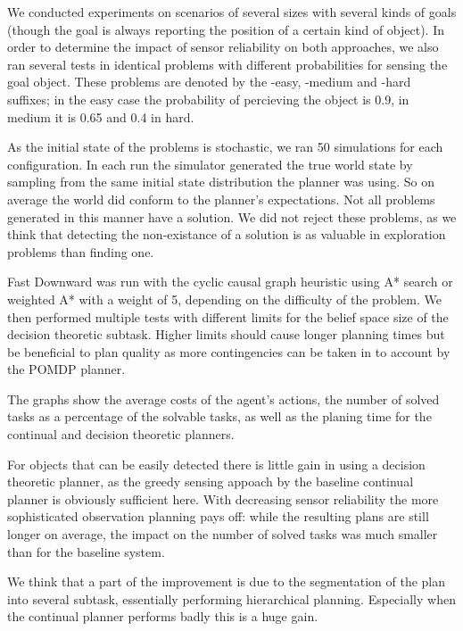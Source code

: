 We conducted experiments on scenarios of several sizes with several
kinds of goals (though the goal is always reporting the position of a
certain kind of object). In order to determine the impact of sensor
reliability on both approaches, we also ran several tests in identical
problems with different probabilities for sensing the goal object.
These problems are denoted by the -easy, -medium and -hard suffixes;
in the easy case the probability of percieving the object is 0.9, in
medium it is 0.65 and 0.4 in hard.

As the initial state of the problems is stochastic, we ran 50
simulations for each configuration. In each run the simulator
generated the true world state by sampling from the same initial state
distribution the planner was using. So on average the world did
conform to the planner's expectations. Not all problems generated in
this manner have a solution. We did not reject these problems, as we
think that detecting the non-existance of a solution is as valuable in
exploration problems than finding one.

Fast Downward was run with the cyclic causal graph heuristic using A*
search or weighted A* with a weight of 5, depending on the difficulty
of the problem. We then performed multiple tests with different limits
for the belief space size of the decision theoretic subtask. Higher
limits should cause longer planning times but be beneficial to plan
quality as more contingencies can be taken in to account by the POMDP
planner.

The graphs show the average costs of the agent's actions, the number
of solved tasks as a percentage of the solvable tasks, as well as the
planing time for the continual and decision theoretic planners.

For objects that can be easily detected there is little gain in using
a decision theoretic planner, as the greedy sensing appoach by the
baseline continual planner is obviously sufficient here. With
decreasing sensor reliability the more sophisticated observation
planning pays off: while the resulting plans are still longer on
average, the impact on the number of solved tasks was much smaller
than for the baseline system. 

We think that a part of the improvement is due to the segmentation of
the plan into several subtask, essentially performing hierarchical
planning. Especially when the continual planner performs badly this is
a huge gain.

